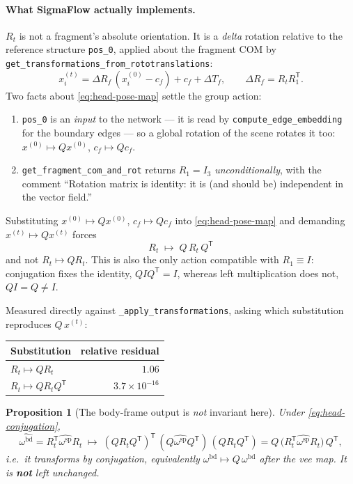 \documentclass[11pt,a4paper]{report}
\newtheorem{proposition}[proposition]{Proposition}
\theoremstyle{definition}
\theoremstyle{remark}
\newcommand{\pyfunc}[1]{\texttt{#1}}
\begin{document}
\paragraph{What SigmaFlow actually implements.} $R_t$ is not a fragment's
absolute orientation. It is a \emph{delta} rotation relative to the reference
structure \texttt{pos\_0}, applied about the fragment COM by
\pyfunc{get\_transformations\_from\_rototranslations}:
\begin{equation}
\label{eq:head-pose-map}
x^{(t)}_i = \Delta R_f\,(x^{(0)}_i-c_f) + c_f + \Delta T_f,
\qquad \Delta R_f = R_t R_1^{\mathsf T} .
\end{equation}
Two facts about \eqref{eq:head-pose-map} settle the group action:
\begin{enumerate}
\item \texttt{pos\_0} is an \emph{input} to the network --- it is read by
      \pyfunc{compute\_edge\_embedding} for the boundary edges --- so a global
      rotation of the scene rotates it too: $x^{(0)}\mapsto Qx^{(0)}$,
      $c_f\mapsto Qc_f$.
\item \pyfunc{get\_fragment\_com\_and\_rot} returns $R_1=I_3$
      \emph{unconditionally}, with the comment ``Rotation matrix is identity:
      it is (and should be) independent in the vector field.''
\end{enumerate}
Substituting $x^{(0)}\mapsto Qx^{(0)}$, $c_f\mapsto Qc_f$ into
\eqref{eq:head-pose-map} and demanding $x^{(t)}\mapsto Qx^{(t)}$ forces
\begin{equation}
\label{eq:head-conjugation}
\boxed{\;R_t\;\longmapsto\;Q\,R_t\,Q^{\mathsf T}\;}
\end{equation}
and not $R_t\mapsto QR_t$. This is also the only action compatible with
$R_1\equiv I$: conjugation fixes the identity, $QIQ^{\mathsf T}=I$, whereas
left multiplication does not, $QI=Q\ne I$.

Measured directly against \pyfunc{\_apply\_transformations}, asking which
substitution reproduces $Q\,x^{(t)}$:
\begin{center}
\begin{tabular}{lr}
\toprule
Substitution & relative residual \\
\midrule
$R_t\mapsto QR_t$ & $1.06$ \\
$R_t\mapsto QR_tQ^{\mathsf T}$ & $3.7\times10^{-16}$ \\
\bottomrule
\end{tabular}
\end{center}

\begin{proposition}[The body-frame output is \emph{not} invariant here]
\label{prop:head-not-invariant}
Under \eqref{eq:head-conjugation},
\[
\widehat{\omega^{\mathrm{bd}}}
= R_t^{\mathsf T}\widehat{\omega^{\mathrm{sp}}}R_t
\;\longmapsto\;
(QR_tQ^{\mathsf T})^{\mathsf T}\,(Q\widehat{\omega^{\mathrm{sp}}}Q^{\mathsf T})\,(QR_tQ^{\mathsf T})
= Q\,\bigl(R_t^{\mathsf T}\widehat{\omega^{\mathrm{sp}}}R_t\bigr)\,Q^{\mathsf T},
\]
i.e.\ it transforms by conjugation, equivalently
$\omega^{\mathrm{bd}}\mapsto Q\,\omega^{\mathrm{bd}}$ after the vee map.
It is \textbf{not} left unchanged.
\end{proposition}
\end{document}
